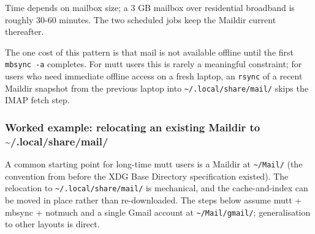 \documentclass[
  11pt,
  letterpaper,
  DIV=11,
  numbers=noendperiod]{scrartcl}
\newenvironment{Shaded}{\begin{snugshade}}{\end{snugshade}}
\newcommand{\AttributeTok}[1]{\textcolor[rgb]{0.40,0.45,0.13}{#1}}
\newcommand{\CommentTok}[1]{\textcolor[rgb]{0.37,0.37,0.37}{#1}}
\newcommand{\DataTypeTok}[1]{\textcolor[rgb]{0.68,0.00,0.00}{#1}}
\newcommand{\ExtensionTok}[1]{\textcolor[rgb]{0.00,0.23,0.31}{#1}}
\newcommand{\NormalTok}[1]{\textcolor[rgb]{0.00,0.23,0.31}{#1}}
\newcommand{\StringTok}[1]{\textcolor[rgb]{0.13,0.47,0.30}{#1}}
\newcommand{\VariableTok}[1]{\textcolor[rgb]{0.07,0.07,0.07}{#1}}
\begin{document}
\begin{Shaded}
\end{Shaded}

Time depends on mailbox size; a 3 GB mailbox over residential broadband
is roughly 30-60 minutes. The two scheduled jobs keep the Maildir
current thereafter.

The one cost of this pattern is that mail is not available offline until
the first \texttt{mbsync\ -a} completes. For mutt users this is rarely a
meaningful constraint; for users who need immediate offline access on a
fresh laptop, an \texttt{rsync} of a recent Maildir snapshot from the
previous laptop into \texttt{\textasciitilde{}/.local/share/mail/} skips
the IMAP fetch step.

\subsubsection{Worked example: relocating an existing Maildir to
\textasciitilde/.local/share/mail/}\label{worked-example-relocating-an-existing-maildir-to-.localsharemail}

A common starting point for long-time mutt users is a Maildir at
\texttt{\textasciitilde{}/Mail/} (the convention from before the XDG
Base Directory specification existed). The relocation to
\texttt{\textasciitilde{}/.local/share/mail/} is mechanical, and the
cache-and-index can be moved in place rather than re-downloaded. The
steps below assume mutt + mbsync + notmuch and a single Gmail account at
\texttt{\textasciitilde{}/Mail/gmail/}; generalisation to other layouts
is direct.
\end{document}
